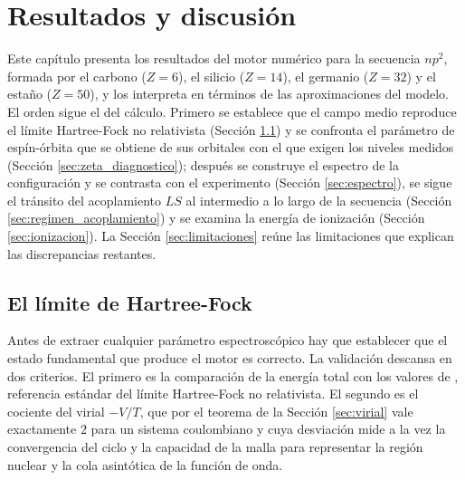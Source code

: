 \chapter{Resultados y discusión}
\label{ch:resultados}

Este capítulo presenta los resultados del motor numérico para la secuencia $np^2$, formada por el carbono ($Z=6$), el silicio ($Z=14$), el germanio ($Z=32$) y el estaño ($Z=50$), y los interpreta en términos de las aproximaciones del modelo. El orden sigue el del cálculo. Primero se establece que el campo medio reproduce el límite Hartree-Fock no relativista (Sección \ref{sec:validacion_hf}) y se confronta el parámetro de espín-órbita que se obtiene de sus orbitales con el que exigen los niveles medidos (Sección \ref{sec:zeta_diagnostico}); después se construye el espectro de la configuración y se contrasta con el experimento (Sección \ref{sec:espectro}), se sigue el tránsito del acoplamiento $LS$ al intermedio a lo largo de la secuencia (Sección \ref{sec:regimen_acoplamiento}) y se examina la energía de ionización (Sección \ref{sec:ionizacion}). La Sección \ref{sec:limitaciones} reúne las limitaciones que explican las discrepancias restantes.

\section{El límite de Hartree-Fock}
\label{sec:validacion_hf}

Antes de extraer cualquier parámetro espectroscópico hay que establecer que el estado fundamental que produce el motor es correcto. La validación descansa en dos criterios. El primero es la comparación de la energía total con los valores de \textcite{fischer1977}, referencia estándar del límite Hartree-Fock no relativista. El segundo es el cociente del virial $-V/T$, que por el teorema de la Sección \ref{sec:virial} vale exactamente $2$ para un sistema coulombiano y cuya desviación mide a la vez la convergencia del ciclo y la capacidad de la malla para representar la región nuclear y la cola asintótica de la función de onda.

\begin{table}[htbp]
    \centering
    
    \caption[Energía total, energía cinética y cociente del virial]{Energía total, energía cinética y cociente del virial frente a los valores de \textcite{fischer1977}. $E_h$ es el hartree, la unidad atómica de energía (Apéndice \ref{ap:unidades-atomicas}); la última columna es la diferencia absoluta, en $E_h$ para $E$ y $T$.}
    \label{tab:resultados_energia_global}
\end{table}

